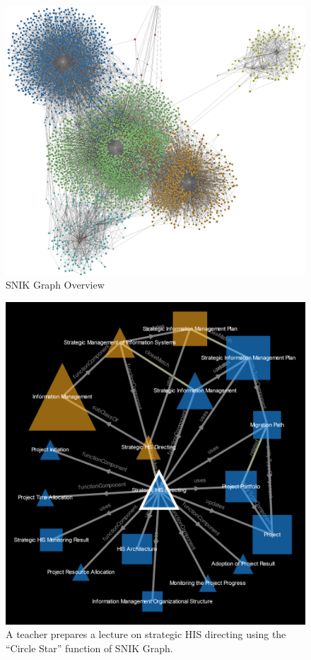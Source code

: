 \documentclass[sw]{iosart2x}
\begin{document}
\begin{figure}
\caption{SNIK Graph Overview}
\label{fig:snik-graph-overview}
\includegraphics[width=\columnwidth]{img/snik-graph-overview.png}
\end{figure}

\begin{figure}
\caption{A teacher prepares a lecture on strategic HIS directing using the \enquote{Circle Star} function of SNIK Graph.}
\label{fig:snik-graph-circlestar}
\includegraphics[width=\columnwidth]{img/snik-graph-circle-star.png}
\end{figure}
\end{document}
